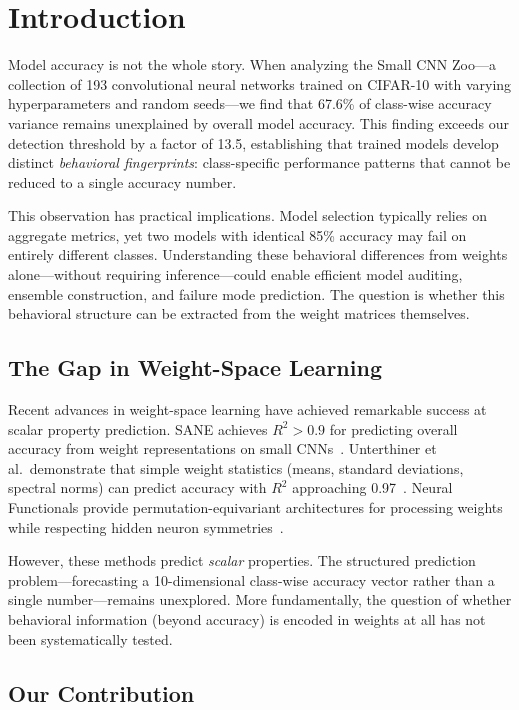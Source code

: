 \section{Introduction}

Model accuracy is not the whole story. When analyzing the Small CNN Zoo---a collection of 193 convolutional neural networks trained on CIFAR-10 with varying hyperparameters and random seeds---we find that 67.6\% of class-wise accuracy variance remains unexplained by overall model accuracy. This finding exceeds our detection threshold by a factor of 13.5, establishing that trained models develop distinct \emph{behavioral fingerprints}: class-specific performance patterns that cannot be reduced to a single accuracy number.

This observation has practical implications. Model selection typically relies on aggregate metrics, yet two models with identical 85\% accuracy may fail on entirely different classes. Understanding these behavioral differences from weights alone---without requiring inference---could enable efficient model auditing, ensemble construction, and failure mode prediction. The question is whether this behavioral structure can be extracted from the weight matrices themselves.

\subsection{The Gap in Weight-Space Learning}

Recent advances in weight-space learning have achieved remarkable success at scalar property prediction. SANE achieves $R^2 > 0.9$ for predicting overall accuracy from weight representations on small CNNs~\cite{schurholt2024sane}. Unterthiner et al.\ demonstrate that simple weight statistics (means, standard deviations, spectral norms) can predict accuracy with $R^2$ approaching 0.97~\cite{unterthiner2020predicting}. Neural Functionals provide permutation-equivariant architectures for processing weights while respecting hidden neuron symmetries~\cite{zhou2023nf}.

However, these methods predict \emph{scalar} properties. The structured prediction problem---forecasting a 10-dimensional class-wise accuracy vector rather than a single number---remains unexplored. More fundamentally, the question of whether behavioral information (beyond accuracy) is encoded in weights at all has not been systematically tested.

\subsection{Our Contribution}

